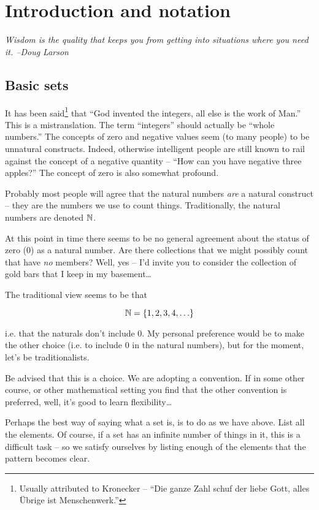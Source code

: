 
\chapter{Introduction and notation}
\label{ch:intro}

{\em Wisdom is the quality that keeps you from getting into situations where you need it.  --Doug Larson}

\section{Basic sets}
\label{sec:basic}

It has been said\footnote{Usually attributed to 
Kronecker -- ``Die ganze Zahl schuf der liebe Gott, alles \"{U}brige 
ist Menschenwerk.''} that ``God invented
the integers, all else is the work of Man.''  This is 
a mistranslation.  The term ``integers'' should
actually be ``whole numbers.''  The concepts of zero and negative 
values seem (to many people) to be unnatural constructs.  Indeed, otherwise
intelligent people are still known to rail against the concept of a
negative quantity -- ``How can you have negative three apples?'' 
The concept of zero is also somewhat profound.

Probably most people will agree that the 
 natural numbers {\em are} a natural construct -- they are the numbers we use to count things.  Traditionally, the natural numbers are denoted ${\mathbb N}$.

At this point in time there seems to be no general agreement about the status
of zero ($0$) as a natural number.  Are there collections that we might possibly
count that have \emph{no} members?  Well, yes -- I'd invite you to consider the collection of gold bars that I keep in my basement\ldots

The traditional view seems to be that 

\[ {\mathbb N} = \{1, 2, 3, 4, \ldots \} \]

\noindent i.e. that the naturals don't include 0.  My personal 
preference would be to make the other choice (i.e. to include $0$
in the natural numbers), but for the moment, let's be traditionalists.

\noindent Be advised that this is a choice.  We are adopting a 
convention.  If in some other course, or other mathematical setting 
you find that the other convention is preferred, well, it's good to
learn flexibility\ldots

Perhaps the best way of saying what a set is, is to do as we 
have above.  List all the elements.  Of course, if a set has an
infinite number of things in it, this is a difficult task -- so
we satisfy ourselves by listing enough of the elements that the
pattern becomes clear.

